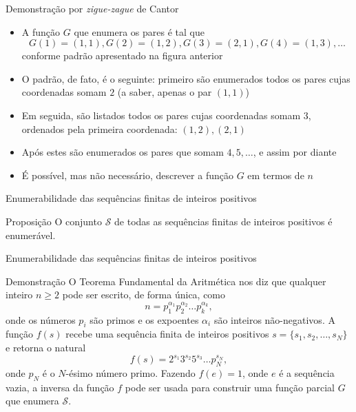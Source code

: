 \begin{frame}[fragile]{Demonstração por {\it zigue-zague} de Cantor} 

    \begin{itemize}
        \item A função $G$ que enumera os pares é tal que 
        \[
            G(1) = (1, 1), G(2) = (1, 2), G(3) = (2, 1), G(4) = (1, 3), \ldots
        \]
        conforme padrão apresentado na figura anterior

        \item O padrão, de fato, é o seguinte: primeiro são enumerados todos os pares cujas
            coordenadas somam $2$ (a saber, apenas o par $(1, 1)$)

        \item Em seguida, são listados todos os pares cujas coordenadas somam $3$, ordenados
            pela primeira coordenada: $(1, 2), (2, 1)$

        \item Após estes são enumerados os pares que somam $4, 5, \ldots$, e assim por diante

        \item É possível, mas não necessário, descrever a função $G$ em termos de $n$
    \end{itemize}

\end{frame}

\begin{frame}[fragile]{Enumerabilidade das sequências finitas de inteiros positivos}

    \begin{block}{Proposição}
        O conjunto $\mathcal{S}$ de todas as sequências finitas de inteiros positivos é enumerável.
    \end{block}
\end{frame}

\begin{frame}[fragile]{Enumerabilidade das sequências finitas de inteiros positivos}
    \begin{block}{Demonstração}
        O Teorema Fundamental da Aritmética nos diz que qualquer inteiro $n\geq 2$ pode ser 
        escrito, de forma única, como
        \[
            n = p_1^{\alpha_1}p_2^{\alpha_2}\ldots p_k^{\alpha_k},
        \]
        onde os números $p_i$ são primos e os expoentes $\alpha_i$ são inteiros não-negativos.
        A função $f(s)$ recebe uma sequência finita de inteiros positivos 
        $s = \lbrace s_1, s_2, \ldots, s_N\rbrace$ e retorna o natural
        \[
            f(s) = 2^{s_1}3^{s_2}5^{s_3}\ldots p_N^{s_N},
        \]
        onde $p_N$ é o $N$-ésimo número primo. 
        Fazendo $f(e) = 1$, onde $e$ é a sequência vazia, a inversa da função $f$ pode ser usada
        para construir uma função parcial $G$ que enumera $\mathcal{S}$.
    \end{block}
    
\end{frame}

